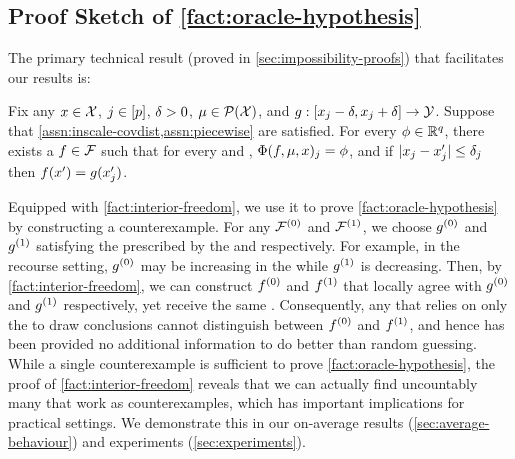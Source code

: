 %

\subsection{Proof Sketch of \cref{fact:oracle-hypothesis}}\label{sec:proof-sketch}

The primary technical result (proved in \cref{sec:impossibility-proofs}) that facilitates our results is:

%
\begin{theorem}\label{fact:interior-freedom}
Fix any \obsname{} $x\in\mathcal{X}$, \covname{} $j\in[p]$, 
%
\radiusname{} $\delta>0$,
\basename{} $\mu \in \mathcal{P}(\mathcal{X})$, 
and
\modbehaviourname{} $g:[x_{j}-\delta, x_{j}+\delta]\to\mathcal{Y}$.
Suppose that \cref{assn:inscale-covdist,assn:piecewise} are satisfied. 
%
For every \attname{} $\phi \in \mathbb{R}^{q}$, there exists 
a \modelname{} $f\in\mathcal{F}$ such that for every \completename{} and \additivename{} \fielddefname{}, $\Phi(f,\mu,x)_{j} = \phi$, and if $\abs[0]{\covval\feat{j}-\covvaldum\feat{j}} \leq \inscale\feat{j}$ then $f(x') = g(x'_{j})$.
\end{theorem}

Equipped with \cref{fact:interior-freedom}, we use it to prove \cref{fact:oracle-hypothesis} by constructing a counterexample. For any \nullname{} $\mathcal{F}^{(0)}$ and \altname{} $\mathcal{F}^{(1)}$, we choose $g^{(0)}$ and $g^{(1)}$ satisfying the \countmodbehaviourname{} prescribed by the \nullname{} and \altname{} respectively. For example, in the recourse setting, $g^{(0)}$ may be increasing in the \covname{} while $g^{(1)}$ is decreasing.
%
Then, by \cref{fact:interior-freedom}, we can construct $f^{(0)}$ and $f^{(1)}$ that locally agree with $g^{(0)}$ and $g^{(1)}$ respectively, yet receive the same \covname{} \attname{}. Consequently, any \oraclehyptestname{} that relies on only the \covname{} \attname{} to draw conclusions cannot distinguish between $f^{(0)}$ and $f^{(1)}$, and hence has been provided no additional information to do better than random guessing.
While a single counterexample is sufficient to prove \cref{fact:oracle-hypothesis}, the proof of \cref{fact:interior-freedom} reveals that we can actually find uncountably many \modelnames{} that work as counterexamples, which has important implications for practical settings.
We demonstrate this in our on-average results (\cref{sec:average-behaviour}) and experiments (\cref{sec:experiments}).

